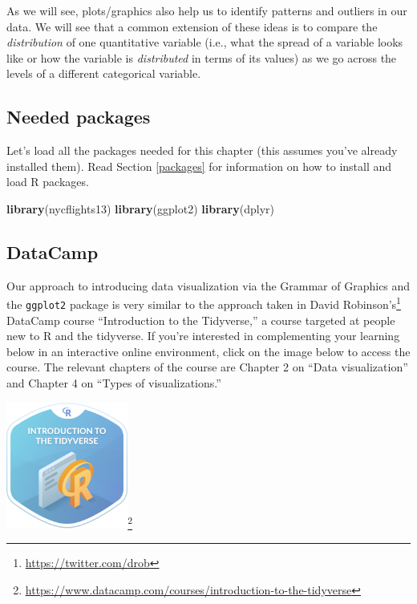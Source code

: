 \documentclass[12pt,]{krantz}
\makeatletter
\newenvironment{Shaded}{\begin{snugshade}}{\end{snugshade}}
\newcommand{\KeywordTok}[1]{\textcolor[rgb]{0.27,0.27,0.27}{\textbf{#1}}}
\newcommand{\NormalTok}[1]{#1}
\renewcommand{\href}[2]{#2\footnote{\url{#1}}}
\newenvironment{kframe}{%
\medskip{}
\setlength{\fboxsep}{.8em}
 \def\at@end@of@kframe{}%
 \ifinner\ifhmode%
  \def\at@end@of@kframe{\end{minipage}}%
  \begin{minipage}{\columnwidth}%
 \fi\fi%
 \def\FrameCommand##1{\hskip\@totalleftmargin \hskip-\fboxsep
 \colorbox{shadecolor}{##1}\hskip-\fboxsep
     \hskip-\linewidth \hskip-\@totalleftmargin \hskip\columnwidth}%
 \MakeFramed {\advance\hsize-\width
   \@totalleftmargin\z@ \linewidth\hsize
   \@setminipage}}%
 {\par\unskip\endMakeFramed%
 \at@end@of@kframe}
\renewenvironment{Shaded}{\begin{kframe}}{\end{kframe}}
\theoremstyle{definition}
\theoremstyle{definition}
\theoremstyle{definition}
\theoremstyle{remark}
\makeatother
\begin{document}
As we will see, plots/graphics also help us to identify patterns and
outliers in our data. We will see that a common extension of these ideas
is to compare the \emph{distribution} of one quantitative variable
(i.e., what the spread of a variable looks like or how the variable is
\emph{distributed} in terms of its values) as we go across the levels of
a different categorical variable.

\subsection*{Needed packages}\label{needed-packages}


Let's load all the packages needed for this chapter (this assumes you've
already installed them). Read Section \ref{packages} for information on
how to install and load R packages.

\begin{Shaded}
\begin{Highlighting}[]
\KeywordTok{library}\NormalTok{(nycflights13)}
\KeywordTok{library}\NormalTok{(ggplot2)}
\KeywordTok{library}\NormalTok{(dplyr)}
\end{Highlighting}
\end{Shaded}

\subsection*{DataCamp}\label{datacamp}


Our approach to introducing data visualization via the Grammar of
Graphics and the \texttt{ggplot2} package is very similar to the
approach taken in \href{https://twitter.com/drob}{David Robinson's}
DataCamp course ``Introduction to the Tidyverse,'' a course targeted at
people new to R and the tidyverse. If you're interested in complementing
your learning below in an interactive online environment, click on the
image below to access the course. The relevant chapters of the course
are Chapter 2 on ``Data visualization'' and Chapter 4 on ``Types of
visualizations.''

\begin{center}
\href{https://www.datacamp.com/courses/introduction-to-the-tidyverse}{\includegraphics[width=0.3\textwidth]{images/datacamp_intro_to_tidyverse.png}}
\end{center}
\end{document}
